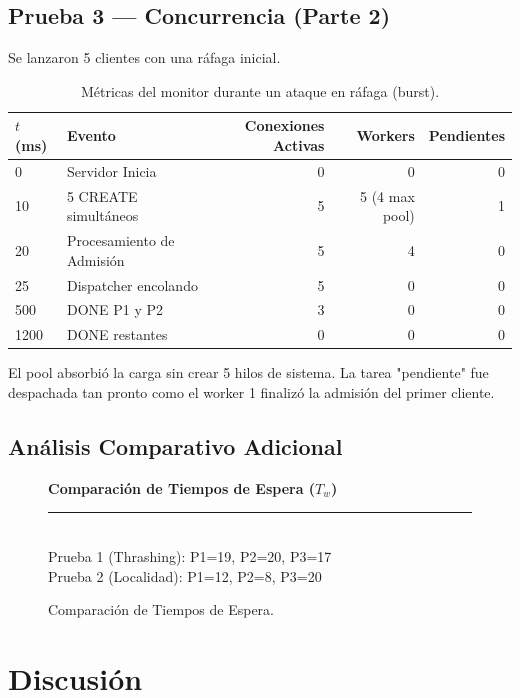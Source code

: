 \documentclass[12pt,letterpaper]{article}
\begin{document}
\subsection{Prueba 3 --- Concurrencia (Parte 2)}
Se lanzaron 5 clientes con una ráfaga inicial.
\begin{table}[H]
\centering
{}
\begin{tabular}{@{}llrrr@{}}
\toprule
\rowcolor{catBlue!40}
$t$ \textbf{(ms)} & \textbf{Evento} & \textbf{Conexiones Activas} & \textbf{Workers} & \textbf{Pendientes} \\ \midrule
0 & Servidor Inicia & 0 & 0 & 0 \\
10 & 5 CREATE simultáneos & 5 & 5 (4 max pool) & 1 \\
20 & Procesamiento de Admisión & 5 & 4 & 0 \\
25 & Dispatcher encolando & 5 & 0 & 0 \\
500 & DONE P1 y P2 & 3 & 0 & 0 \\
1200 & DONE restantes & 0 & 0 & 0 \\ \bottomrule
\end{tabular}
\caption{Métricas del monitor durante un ataque en ráfaga (burst).}
\end{table}
El pool absorbió la carga sin crear 5 hilos de sistema.
La tarea "pendiente" fue despachada tan pronto como el worker 1 finalizó la admisión del primer cliente.
\subsection{Análisis Comparativo Adicional}

\begin{figure}[H]
\centering
\begin{tcolorbox}[colback=gray!10, colframe=gray!30, arc=4pt]
\centering
\textbf{Comparación de Tiempos de Espera ($T_w$)}\\[0.5em]
\rule{\textwidth}{0.4pt}\\[0.5em]
Prueba 1 (Thrashing): P1=19, P2=20, P3=17\\[0.2em]
Prueba 2 (Localidad): P1=12, P2=8, P3=20
\end{tcolorbox}
\caption{Comparación de Tiempos de Espera.}
\end{figure}

\newpage
\section{Discusión}
\end{document}
